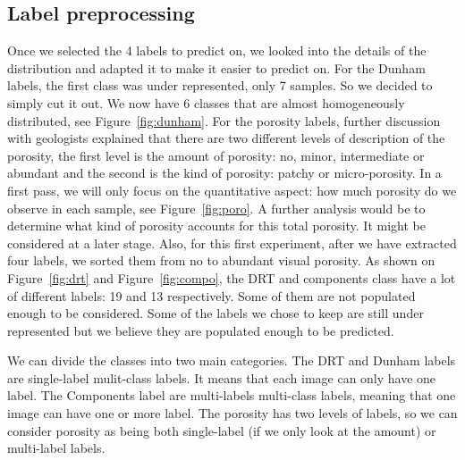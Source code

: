 \subsection{Label preprocessing}
Once we selected the 4 labels to predict on, we looked into the details of the distribution and adapted it to make it easier to predict on. For the Dunham labels, the first class was under represented, only 7 samples. So we decided to simply cut it out. We now have 6 classes that are almost homogeneously distributed, see Figure~\ref{fig:dunham}. 
For the porosity labels, further discussion with geologists explained that there are two different levels of description of the porosity, the first level is the amount of porosity: no, minor, intermediate or abundant and the second is the kind of porosity: patchy or micro-porosity. In a first pass, we will only focus on the quantitative aspect: how much porosity do we observe in each sample, see Figure~\ref{fig:poro}. A further analysis would be to determine what kind of porosity accounts for this total porosity. It might be considered at a later stage. Also, for this first experiment, after we have extracted four labels, we sorted them from no to abundant visual porosity. 
As shown on Figure~\ref{fig:drt} and Figure~\ref{fig:compo}, the DRT and components class have a lot of different labels: 19 and 13 respectively. Some of them are not populated enough to be considered. Some of the labels we chose to keep are still under represented but we believe they are populated enough to be predicted.

We can divide the classes into two main categories. The DRT and Dunham labels are single-label mulit-class labels. It means that each image can only have one label. The Components label are multi-labels multi-class labels, meaning that one image can have one or more label. The porosity has two levels of labels, so we can consider porosity as being both single-label (if we only look at the amount) or multi-label labels. 



